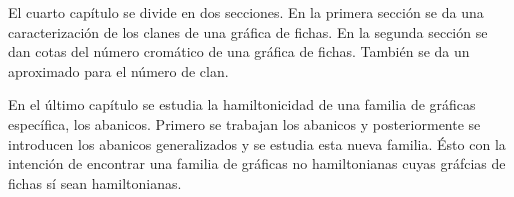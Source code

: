 El cuarto cap\'itulo se  divide en dos secciones. En la primera secci\'on se da
una caracterizaci\'on de los clanes de una gr\'afica de fichas. En la segunda
secci\'on se dan cotas del n\'umero crom\'atico de una gr\'afica de fichas.
Tambi\'en se da un aproximado para el n\'umero de clan.

En el \'ultimo cap\'itulo se estudia la hamiltonicidad de una familia de
gr\'aficas espec\'ifica, los abanicos. Primero se trabajan los abanicos y
posteriormente se introducen los abanicos generalizados y se estudia esta nueva
familia. \'Esto con la intenci\'on de encontrar una familia de gr\'aficas no
hamiltonianas cuyas gr\'afcias de fichas s\'i sean hamiltonianas.